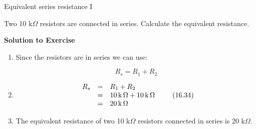       \begin{wex}{Equivalent series resistance I}{
          \label{m38776*probfhsst!!!underscore!!!id904}
          \label{m38776*id64862}Two 10 k$\Omega $ resistors are connected in series. Calculate the equivalent resistance. \par 
          \vspace{5pt}}{
          \label{m38776*solfhsst!!!underscore!!!id907}\noindent\textbf{Solution to Exercise } \label{m38776*listfhsst!!!underscore!!!id907}\begin{enumerate}[noitemsep, label=\textbf{Step} \textbf{\arabic*}. ] 
            \leftskip=20pt\rightskip=\leftskip\item  
          \label{m38776*id64896}Since the resistors are in series we can use:\par 
          \label{m38776*id64899}\nopagebreak\noindent{}
            
    \begin{equation}
    {R}_{s}={R}_{1}+{R}_{2}\tag{16.33}
      \end{equation}
          \item  
          \label{m38776*id64940}\nopagebreak\noindent{}
            
    \begin{equation}
    \begin{array}{ccc}\hfill {R}_{s}& =& {R}_{1}+{R}_{2}\hfill \\ & =& 10\phantom{\rule{0.166667em}{0ex}}\mathrm{k}\phantom{\rule{0.166667em}{0ex}}\Omega +10\phantom{\rule{0.166667em}{0ex}}\mathrm{k}\phantom{\rule{0.166667em}{0ex}}\Omega \hfill \\ & =& 20\phantom{\rule{0.166667em}{0ex}}\mathrm{k}\phantom{\rule{0.166667em}{0ex}}\Omega \hfill \end{array}\tag{16.34}
      \end{equation}
          \item  
          \label{m38776*id65061}The equivalent resistance of two 10 k$\Omega $ resistors connected in series is 20 k$\Omega $. \par 
          \end{enumerate}}
    \end{wex}
    \noindent
\label{m38776*secfhsst!!!underscore!!!id1001}\vspace{.5cm} 
      \noindent

